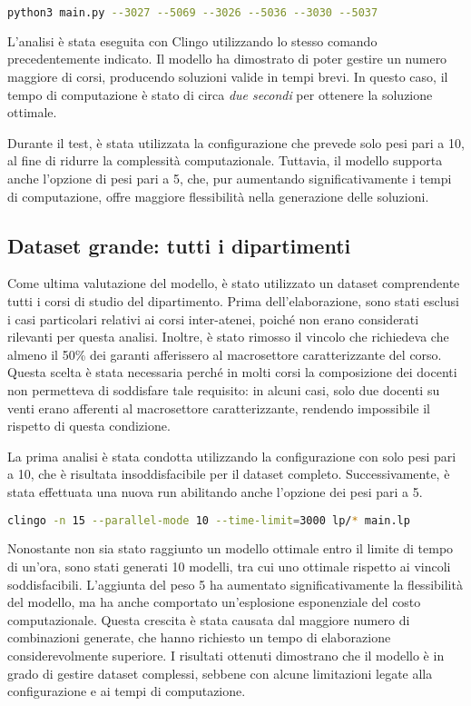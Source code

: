 \begin{lstlisting}[language=bash]
 python3 main.py --3027 --5069 --3026 --5036 --3030 --5037
\end{lstlisting}

L'analisi è stata eseguita con Clingo utilizzando lo stesso comando precedentemente 
indicato. Il modello ha dimostrato di poter gestire un numero maggiore di corsi, producendo 
soluzioni valide in tempi brevi. In questo caso, il tempo di computazione è stato di circa 
\textit{due secondi} per ottenere la soluzione ottimale.

Durante il test, è stata utilizzata la configurazione che prevede solo pesi pari a 10, al 
fine di ridurre la complessità computazionale. Tuttavia, il modello supporta anche l'opzione 
di pesi pari a 5, che, pur aumentando significativamente i tempi di computazione, offre 
maggiore flessibilità nella generazione delle soluzioni.


\subsection{Dataset grande: tutti i dipartimenti}
\label{sec:dataset-tutti-dipartimenti}

Come ultima valutazione del modello, è stato utilizzato un dataset 
comprendente tutti i corsi di studio del dipartimento. Prima dell'elaborazione, sono stati 
esclusi i casi particolari relativi ai corsi inter-atenei, poiché non erano considerati 
rilevanti per questa analisi. Inoltre, è stato rimosso il vincolo che richiedeva che almeno 
il 50\% dei garanti afferissero al macrosettore caratterizzante del corso. Questa scelta è 
stata necessaria perché in molti corsi la composizione dei docenti non permetteva di 
soddisfare tale requisito: in alcuni casi, solo due docenti su venti erano afferenti al 
macrosettore caratterizzante, rendendo impossibile il rispetto di questa condizione.

La prima analisi è stata condotta utilizzando la configurazione con solo pesi pari a 10, 
che è risultata insoddisfacibile per il dataset completo. Successivamente, è stata 
effettuata una nuova run abilitando anche l'opzione dei pesi pari a 5.

\begin{lstlisting}[language=bash]
 clingo -n 15 --parallel-mode 10 --time-limit=3000 lp/* main.lp
\end{lstlisting}

Nonostante non sia stato raggiunto un modello ottimale entro il limite di tempo di un'ora, 
sono stati generati 10 modelli, tra cui uno ottimale rispetto ai vincoli soddisfacibili. 
L'aggiunta del peso 5 ha aumentato significativamente la flessibilità del modello, ma ha 
anche comportato un'esplosione esponenziale del costo computazionale. Questa crescita è 
stata causata dal maggiore numero di combinazioni generate, che hanno richiesto un tempo di 
elaborazione considerevolmente superiore. I risultati ottenuti dimostrano che il modello 
è in grado di gestire dataset complessi, sebbene con alcune limitazioni legate alla 
configurazione e ai tempi di computazione. 
